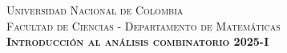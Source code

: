 \setlength{\parindent}{0cm}%
\hoffset-0.460cm
\voffset-1.46cm
\begin{window}
\scshape
\thispagestyle{plain}

\LARGE\hspace{1cm}\textsc{Universidad Nacional de Colombia}\\
\textcolor{white}{\tiny} \hspace{2cm}\textsc{\small Facultad de Ciencias - Departamento de Matemáticas}\\
\textcolor{white}{\tiny} \hspace{2.0cm}\textsc{\small \textbf{Introducción al análisis combinatorio 2025-I}\\}
\Large\hspace{0.00002cm}\\\\
\end{window}
\normalfont
\normalsize 
